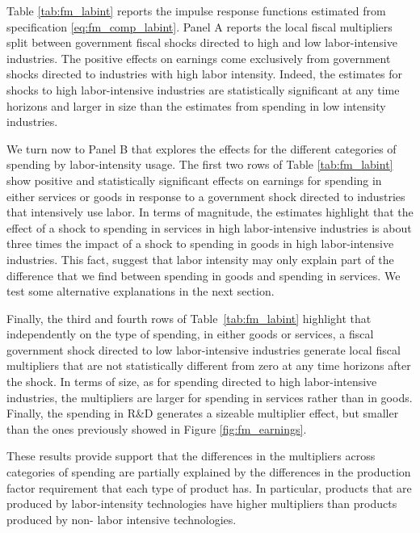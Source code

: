 \documentclass[dv_diss_main.tex]{subfiles}
\begin{document}
Table \ref{tab:fm_labint} reports the impulse response functions estimated from specification \eqref{eq:fm_comp_labint}. Panel A reports the local fiscal multipliers split between government fiscal shocks directed to high and low labor-intensive industries. The positive effects on earnings come exclusively from government shocks directed to industries with high labor intensity. Indeed, the estimates for shocks to high labor-intensive industries are statistically significant at any time horizons and larger in size than the estimates from spending in low intensity industries.

We turn now to Panel B that explores the effects for the different categories of spending by labor-intensity usage. The first two rows of Table \ref{tab:fm_labint} show positive and statistically significant effects on earnings for spending in either services or goods in response to a government shock directed to industries that intensively use labor. In terms of magnitude, the estimates highlight that the effect of a shock to spending in services in high labor-intensive industries is about three times the impact of a shock to spending in goods in high labor-intensive industries. This fact, suggest that labor intensity may only explain part of the difference that we find between spending in goods and spending in services. We test some alternative explanations in the next section. 

Finally, the third and fourth rows of Table~\ref{tab:fm_labint} highlight that independently on the type of spending, in either goods or services, a fiscal government shock directed to low labor-intensive industries generate local fiscal multipliers that are not statistically different from zero at any time horizons after the shock. In terms of size, as for spending directed to high labor-intensive industries, the multipliers are larger for spending in services rather than in goods. Finally, the spending in R\&D generates a sizeable multiplier effect, but smaller than the ones previously showed in Figure \ref{fig:fm_earnings}.

These results provide support that the differences in the multipliers across categories of spending are partially explained by the differences in the production factor requirement that each type of product has. In particular, products that are produced by labor-intensity technologies have higher multipliers than products produced by non- labor intensive technologies. 
\end{document}
